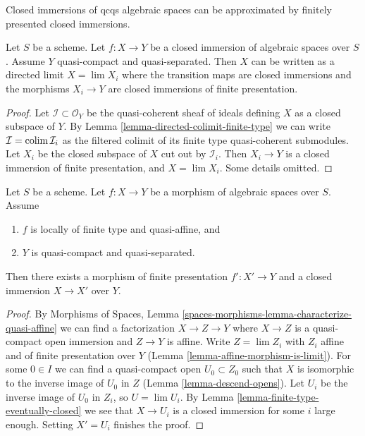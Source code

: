 \begin{lemma}
\label{lemma-closed-is-limit-closed-and-finite-presentation}
\begin{slogan}
Closed immersions of qcqs algebraic spaces can be approximated
by finitely presented closed immersions.
\end{slogan}
Let $S$ be a scheme. Let $f : X \to Y$ be a closed immersion of algebraic
spaces over $S$. Assume $Y$ quasi-compact and quasi-separated.
Then $X$ can be written as a directed limit $X = \lim X_i$
where the transition maps are closed immersions and the morphisms
$X_i \to Y$ are closed immersions of finite presentation.
\end{lemma}

\begin{proof}
Let $\mathcal{I} \subset \mathcal{O}_Y$ be the quasi-coherent sheaf
of ideals defining $X$ as a closed subspace of $Y$. By
Lemma \ref{lemma-directed-colimit-finite-type}
we can write $\mathcal{I} = \mathop{\mathrm{colim}}\nolimits \mathcal{I}_i$ as the
filtered colimit of its finite type quasi-coherent submodules.
Let $X_i$ be the closed subspace of $X$ cut out by $\mathcal{I}_i$.
Then $X_i \to Y$ is a closed immersion of finite presentation,
and $X = \lim X_i$. Some details omitted.
\end{proof}

\begin{lemma}
\label{lemma-quasi-affine-closed-in-finite-presentation}
Let $S$ be a scheme. Let $f : X \to Y$ be a morphism of algebraic spaces
over $S$. Assume
\begin{enumerate}
\item $f$ is locally of finite type and quasi-affine, and
\item $Y$ is quasi-compact and quasi-separated.
\end{enumerate}
Then there exists a morphism of finite presentation
$f' : X' \to Y$ and a closed immersion $X \to X'$ over $Y$.
\end{lemma}

\begin{proof}
By Morphisms of Spaces, Lemma
\ref{spaces-morphisms-lemma-characterize-quasi-affine}
we can find a factorization $X \to Z \to Y$ where
$X \to Z$ is a quasi-compact open immersion and
$Z \to Y$ is affine. Write $Z = \lim Z_i$ with $Z_i$ affine and
of finite presentation over $Y$ (Lemma \ref{lemma-affine-morphism-is-limit}).
For some $0 \in I$ we can find a quasi-compact open $U_0 \subset Z_0$
such that $X$ is isomorphic to the inverse image of $U_0$ in $Z$
(Lemma \ref{lemma-descend-opens}). Let $U_i$ be the inverse image of
$U_0$ in $Z_i$, so $U = \lim U_i$. By
Lemma \ref{lemma-finite-type-eventually-closed}
we see that $X \to U_i$ is a closed immersion for some $i$ large enough.
Setting $X' = U_i$ finishes the proof.
\end{proof}

